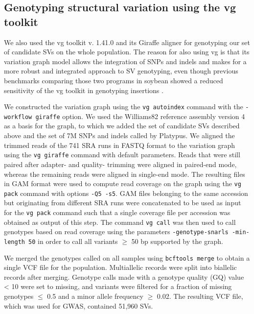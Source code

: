 \subsection*{Genotyping structural variation using the vg toolkit}
\label{sv-gwas-sv-genotyping-vg}

We also used the vg toolkit v. 1.41.0 \citep{hickey2020} and its Giraffe
aligner \citep{siren2021} for genotyping our set of candidate SVs on the whole
population. The reason for also using vg is that its variation graph model allows
the integration of SNPs and indels and makes for a more robust and integrated
approach to SV genotyping, even though previous benchmarks comparing those two
programs in soybean showed a reduced sensitivity of the vg toolkit in
genotyping insertions \citep{lemay2022}.

We constructed the variation graph using the \texttt{vg autoindex} command with
the \texttt{-\-workflow giraffe} option. We used the Williams82 reference
assembly version 4 as a basis for the graph, to which we added the set of
candidate SVs described above and the set of 7M SNPs and indels called by
Platypus.  We aligned the trimmed reads of the 741 SRA runs in FASTQ format to
the variation graph using the \texttt{vg giraffe} command with default
parameters. Reads that were still paired after adapter- and quality- trimming
were aligned in paired-end mode, whereas the remaining reads were aligned in
single-end mode. The resulting files in GAM format were used to compute read
coverage on the graph using the \texttt{vg pack} command with options
\texttt{-Q5 -s5}. GAM files belonging to the same accession but originating
from different SRA runs were concatenated to be used as input for the
\texttt{vg pack} command such that a single coverage file per accession was
obtained as output of this step. The command \texttt{vg call} was then used to
call genotypes based on read coverage using the parameters
\texttt{-\-genotype-snarls -\-min-length 50} in order to call all variants
$\geq$ 50 bp supported by the graph.

We merged the genotypes called on all samples using \texttt{bcftools merge} to
obtain a single VCF file for the population. Multiallelic records were split
into biallelic records after merging. Genotype calls made with a genotype
quality (GQ) value < 10 were set to missing, and variants were filtered for a
fraction of missing genotypes $\leq$ 0.5 and a minor allele frequency $\geq$
0.02. The resulting VCF file, which was used for GWAS, contained 51,960 SVs.


